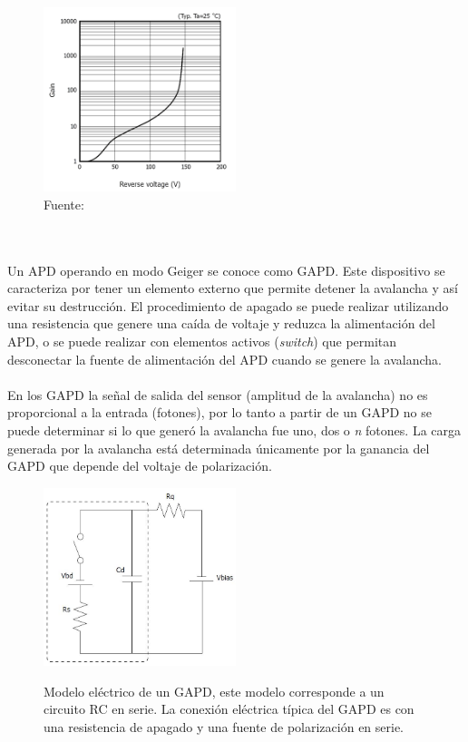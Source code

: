 \begin{figure}[h!]
\begin{centering}
  \caption{Ganancia del APD en función del voltaje de polarización inverso donde se pueden observar las regiones de operación del dispositivo. Adaptado de \footcite{MPPC_note}.}
  \includegraphics[width=0.5\textwidth]{Images/GAPD_gain.JPG}
  \caption*{Fuente:}
  \label{fig:APD_gain}
  \par\end{centering}
\end{figure}
 \\ \\
Un APD operando en modo Geiger se conoce como GAPD. Este dispositivo se caracteriza por tener un elemento externo que permite detener la avalancha y así evitar su destrucción. El procedimiento de apagado se puede realizar utilizando una resistencia que genere una caída de voltaje y reduzca la alimentación del APD, o se puede realizar con elementos activos (\textit{switch}) que permitan desconectar la fuente de alimentación del APD cuando se genere la avalancha.\\ \\
En los GAPD la señal de salida del sensor (amplitud de la avalancha) no es proporcional a la entrada (fotones), por lo tanto a partir de un GAPD no se puede determinar si lo que generó la avalancha fue uno, dos o \textit{n} fotones. La carga generada por la avalancha está determinada únicamente por la ganancia del GAPD que  depende del voltaje de polarización.     
\begin{figure}[h!]
\begin{centering}
    \caption{Modelo eléctrico de un GAPD, este modelo corresponde a un circuito RC en serie. La conexión eléctrica típica del GAPD es con una resistencia de apagado y una fuente de polarización en serie.}
    \includegraphics[width=0.5\textwidth]{Images/GAPD_model.JPG}
    \label{fig:APD_model}
  \par\end{centering}
\end{figure}
